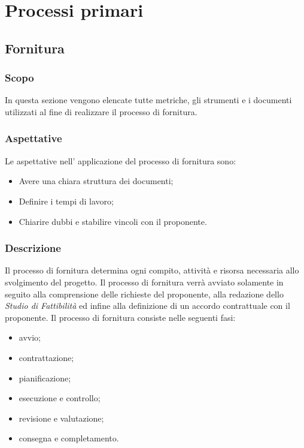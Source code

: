 \setcounter{secnumdepth}{5}
\makeatletter
\renewcommand\subparagraph{
\@startsection {subparagraph}{5}{0mm}{-\baselineskip}{.5\baselineskip}{\normalfont \normalsize \bfseries }}
\makeatother

\section{Processi primari}\label{section:Processi_primari}
\subsection{Fornitura} \label{subsection:Fornitura}
\subsubsection{Scopo}\label{subsubsection: scopo_fornitura}
In questa sezione vengono elencate tutte metriche, gli strumenti e i documenti utilizzati al fine di realizzare il processo di fornitura.
\subsubsection{Aspettative}\label{subsubsection: aspettative_fornitura}
Le aspettative nell' applicazione del processo di fornitura sono:
\begin {itemize}
    \item Avere una chiara struttura dei documenti;
    \item Definire i tempi di lavoro;
    \item Chiarire dubbi e stabilire vincoli con il proponente.
\end {itemize}
\subsubsection{Descrizione}\label{subsubsection: descrizione_fornitura}
Il processo di fornitura determina ogni compito, attività e risorsa necessaria allo svolgimento del progetto.
Il processo di fornitura verrà avviato solamente in seguito alla comprensione delle richieste del proponente, alla redazione dello \textit{Studio di Fattibilità} ed infine alla definizione di un accordo contrattuale con il proponente.
Il processo di fornitura consiste nelle seguenti fasi:
\begin {itemize}
    \item avvio;
    \item contrattazione;
    \item pianificazione;
    \item esecuzione e controllo;
    \item revisione e valutazione;
    \item consegna e completamento.
\end {itemize}
